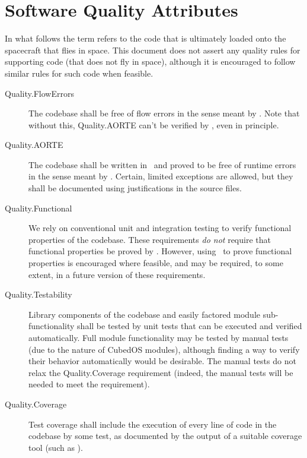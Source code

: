 
\section{Software Quality Attributes}

In what follows the term  refers to the code that is ultimately loaded onto
the spacecraft that flies in space. This document does not assert any quality rules for
supporting code (that does not fly in space), although it is encouraged to follow similar rules
for such code when feasible.

\begin{description}
\item[Quality.FlowErrors] The codebase shall be free of flow errors in the sense meant by
  \SPARK. Note that without this, Quality.AORTE can't be verified by \SPARK, even in principle.

\item[Quality.AORTE] The codebase shall be written in \SPARK\ and proved to be free of runtime
  errors in the sense meant by \SPARK. Certain, limited exceptions are allowed, but they shall
  be documented using justifications in the source files.

\item[Quality.Functional] We rely on conventional unit and integration testing to verify
  functional properties of the codebase. These requirements \emph{do not} require that
  functional properties be proved by \SPARK. However, using \SPARK\ to prove functional
  properties is encouraged where feasible, and may be required, to some extent, in a future
  version of these requirements.

\item[Quality.Testability] Library components of the codebase and easily factored module
  sub-functionality shall be tested by unit tests that can be executed and verified
  automatically. Full module functionality may be tested by manual tests (due to the nature of
  CubedOS modules), although finding a way to verify their behavior automatically would be
  desirable. The manual tests do not relax the Quality.Coverage requirement (indeed, the manual
  tests will be needed to meet the requirement).

\item[Quality.Coverage] Test coverage shall include the execution of every line of code in the
  codebase by some test, as documented by the output of a suitable coverage tool (such as
  ).


\end{description}
